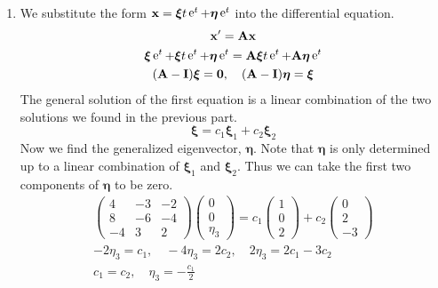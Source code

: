 {\begin{Solution}
\begin{enumerate}
\begin{enumerate}
\[{        }
      \]
    \item 
      We substitute the form $\mathbf{x} = \boldsymbol{\xi} t \mathop{\mathrm{e}}\nolimits^t + \boldsymbol{\eta} \mathop{\mathrm{e}}\nolimits^t$ into 
      the differential equation.
      \begin{gather*}
        \mathbf{x}' = \mathbf{A} \mathbf{x} \\
        \boldsymbol{\xi} \mathop{\mathrm{e}}\nolimits^t + \boldsymbol{\xi} t \mathop{\mathrm{e}}\nolimits^t + \boldsymbol{\eta} \mathop{\mathrm{e}}\nolimits^t 
        = \mathbf{A} \boldsymbol{\xi} t \mathop{\mathrm{e}}\nolimits^t + \mathbf{A} \boldsymbol{\eta} \mathop{\mathrm{e}}\nolimits^t \\
        (\mathbf{A} - \mathbf{I}) \boldsymbol{\xi} = \mathbf{0}, \quad 
        (\mathbf{A} - \mathbf{I}) \boldsymbol{\eta} = \boldsymbol{\xi}
      \end{gather*}
      The general solution of the first equation is a linear combination of the 
      two solutions we found in the previous part.
      \[
      \boldsymbol{\xi} = c_1 \boldsymbol{\xi}_1 + c_2 \boldsymbol{\xi}_2
      \]
      Now we find the generalized eigenvector, $\boldsymbol{\eta}$.  Note that $\boldsymbol{\eta}$ is 
      only determined up to a linear combination of $\boldsymbol{\xi}_1$ and $\boldsymbol{\xi}_2$.  Thus
      we can take the first two components of $\boldsymbol{\eta}$ to be zero.
      \begin{gather*}
        \begin{pmatrix}
          4 & -3 & -2 \\
          8 & -6 & -4 \\
          -4 & 3 & 2
        \end{pmatrix}
        \begin{pmatrix}
          0 \\
          0 \\
          \eta_3
        \end{pmatrix}
        = 
        c_1 \begin{pmatrix}
          1 \\
          0 \\
          2
        \end{pmatrix}
        + c_2 \begin{pmatrix}
          0 \\
          2 \\
          -3
        \end{pmatrix} \\
        -2 \eta_3 = c_1, \quad -4 \eta_3 = 2 c_2, \quad 2 \eta_3 = 2 c_1 - 3 c_2 \\
        c_1 = c_2, \quad \eta_3 = - \frac{c_1}{2}

\end{gather*}
\end{enumerate}
\end{enumerate}
\end{Solution}}

